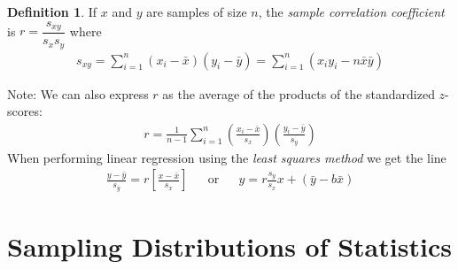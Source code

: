 \documentclass[10pt]{article}
\theoremstyle{definition}
\newtheorem*{definition}{Definition}
\theoremstyle{theorem}
\begin{document}
\begin{definition}
	If \(x\) and \(y\) are samples of size \(n\), the \emph{sample correlation coefficient} is \(r=\dfrac{s_{xy}}{s_x s_y}\) where
	\begin{align*}
		s_{xy} = \sum_{i=1}^{n}(x_i - \bar{x})(y_i - \bar{y}) = \sum_{i=1}^{n}(x_i y_i - n\bar{x}\bar{y})
	\end{align*}
\end{definition}
Note: We can also express \(r\) as the average of the products of the standardized \(z\)-scores:
\begin{align*}
	r = \frac{1}{n-1} \sum_{i=1}^{n} \left( \frac{x_i-\bar{x}}{s_x} \right) \left( \frac{y_i-\bar{y}}{s_y} \right)
\end{align*}
When performing linear regression using the \emph{least squares method} we get the line
\begin{align*}
	\frac{y-\bar{y}}{s_y} = r \left[\frac{x-\bar{x}}{s_x}\right] && \text{or} && y = r\frac{s_y}{s_x}x + (\bar{y}-b\bar{x})
\end{align*}

\section*{Sampling Distributions of Statistics}
\end{document}
